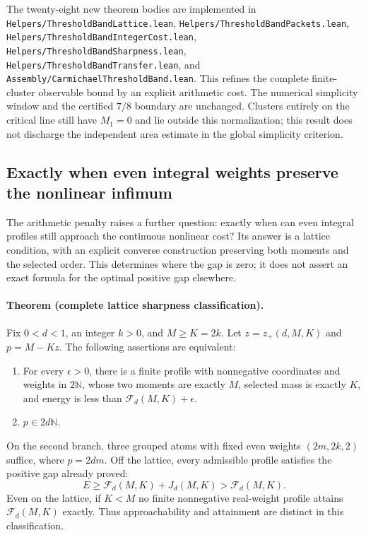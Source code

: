 The twenty-eight new theorem bodies are implemented in
\texttt{Helpers/ThresholdBandLattice.lean},
\texttt{Helpers/ThresholdBandPackets.lean},
\texttt{Helpers/ThresholdBandIntegerCost.lean},
\texttt{Helpers/ThresholdBandSharpness.lean},
\texttt{Helpers/ThresholdBandTransfer.lean}, and
\texttt{Assembly/CarmichaelThresholdBand.lean}.
This refines the complete finite-cluster observable bound by an explicit
arithmetic cost.  The numerical simplicity window and the certified
\(7/8\) boundary are unchanged.  Clusters entirely on the critical line
still have \(M_1=0\) and lie outside this normalization; this result does
not discharge the independent area estimate in the global simplicity
criterion.

\subsection{Exactly when even integral weights preserve the nonlinear infimum}
\label{sec:nonlinear-integer-sharpness}

The arithmetic penalty raises a further question: exactly when can even
integral profiles still approach the continuous nonlinear cost?  Its answer
is a lattice condition, with an explicit converse construction preserving
both moments and the selected order.  This determines where the gap is zero;
it does not assert an exact formula for the optimal positive gap elsewhere.

\paragraph{Theorem (complete lattice sharpness classification).}
Fix \(0<d<1\), an integer \(k>0\), and \(M\ge K=2k\).  Let \(z=z_+(d,M,K)\)
and \(p=M-Kz\).  The following assertions are equivalent:
\begin{enumerate}
\item For every \(\epsilon>0\), there is a finite profile with nonnegative
coordinates and weights in \(2\mathbb N\), whose two moments are exactly
\(M\), selected mass is exactly \(K\), and energy is less than
\(\mathcal F_d(M,K)+\epsilon\).
\item \(p\in2d\mathbb N\).
\end{enumerate}
On the second branch, three grouped atoms with fixed even weights
\((2m,2k,2)\) suffice, where \(p=2dm\).  Off the lattice, every admissible
profile satisfies the positive gap already proved:
\[
 E\ge\mathcal F_d(M,K)+J_d(M,K)>\mathcal F_d(M,K).
\]
Even on the lattice, if \(K<M\) no finite nonnegative real-weight profile
attains \(\mathcal F_d(M,K)\) exactly.  Thus approachability and attainment
are distinct in this classification.

